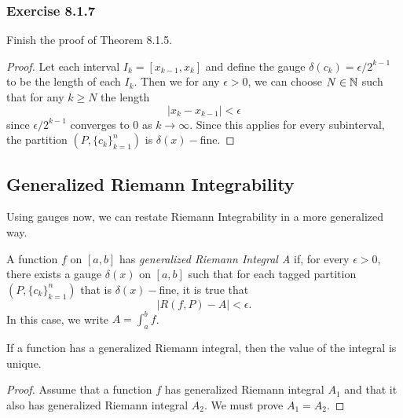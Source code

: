 \subsubsection{Exercise 8.1.7} Finish the proof of Theorem 8.1.5.
\begin{proof}
    Let each interval \( I_{k } = [x_{k-1}, x_{k }] \) and define the gauge \( \delta(c_{k }) =   \epsilon / 2^{k-1}  \) to be the length of each \( I_{k } \). Then we for any \( \epsilon > 0  \), we can choose \( N \in \mathbb{N}  \) such that for any \(  k \geq N  \) the length 
    \[  | x_{k} - x_{k-1}  | < \epsilon \] since \( \epsilon / 2^{k-1}  \) converges to \( 0  \) as \( k \to \infty  \). Since this applies for every subinterval, the partition \( (P, \{ c_{k }  \}_{k=1}^{n}) \) is \( \delta(x)- \)fine.


\end{proof}

\subsection{Generalized Riemann Integrability} 
Using gauges now, we can restate Riemann Integrability in a more generalized way.
\begin{definition}
    A function \( f  \) on \( [a,b]  \) has \textit{generalized Riemann Integral A} if, for every \( \epsilon > 0  \), there exists a gauge \( \delta(x)  \) on \( [a,b]  \) such that for each tagged partition \( (P, \{ c_{k } \}_{k=1}^n) \) that is \( \delta(x)- \)fine, it is true that 
    \[  | R(f,P) - A  | <\epsilon. \] In this case, we write \( A = \int_{ a }^{ b } f \).
\end{definition}

\begin{theorem}
If a function has a generalized Riemann integral, then the value of the integral is unique.
\end{theorem}

\begin{proof}
Assume that a function \( f  \) has generalized Riemann integral \( A_{1} \) and that it also has generalized Riemann integral \( A_{2} \). We must prove \( A_{1} = A_{2} \).
\end{proof}

